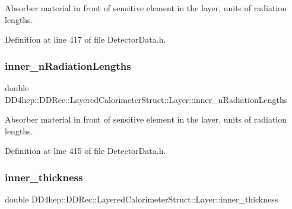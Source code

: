 Absorber material in front of sensitive element in the layer, units of radiation lengths. 



Definition at line 417 of file Detector\+Data.\+h.

\hypertarget{struct_d_d4hep_1_1_d_d_rec_1_1_layered_calorimeter_struct_1_1_layer_aeb711a3f909969fd48ea8e3f6b67473b}{}\label{struct_d_d4hep_1_1_d_d_rec_1_1_layered_calorimeter_struct_1_1_layer_aeb711a3f909969fd48ea8e3f6b67473b} 
\subsubsection{\texorpdfstring{inner\+\_\+n\+Radiation\+Lengths}{inner\_nRadiationLengths}}
{\footnotesize\ttfamily double D\+D4hep\+::\+D\+D\+Rec\+::\+Layered\+Calorimeter\+Struct\+::\+Layer\+::inner\+\_\+n\+Radiation\+Lengths}



Absorber material in front of sensitive element in the layer, units of radiation lengths. 



Definition at line 415 of file Detector\+Data.\+h.

\hypertarget{struct_d_d4hep_1_1_d_d_rec_1_1_layered_calorimeter_struct_1_1_layer_a93e6705275f50921dbc1d816bcbd5f73}{}\label{struct_d_d4hep_1_1_d_d_rec_1_1_layered_calorimeter_struct_1_1_layer_a93e6705275f50921dbc1d816bcbd5f73} 
\subsubsection{\texorpdfstring{inner\+\_\+thickness}{inner\_thickness}}
{\footnotesize\ttfamily double D\+D4hep\+::\+D\+D\+Rec\+::\+Layered\+Calorimeter\+Struct\+::\+Layer\+::inner\+\_\+thickness}



